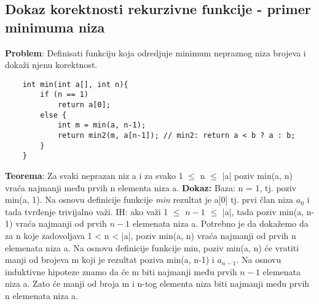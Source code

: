 \documentclass{article}
\begin{document}
\subsection{Dokaz korektnosti rekurzivne funkcije - primer minimuma niza}
\textbf{Problem}: Definisati funkciju koja odredjuje minimum nepraznog niza brojeva i dokaži njenu korektnost.
\begin{lstlisting}
    int min(int a[], int n){
        if (n == 1)
  	        return a[0]; 
        else { 
		    int m = min(a, n-1); 
		    return min2(m, a[n-1]); // min2: return a < b ? a : b;
	    }
    }
\end{lstlisting}
\textbf{Teorema}: Za svaki neprazan niz a i za svako 1 $\leq$ n $\leq$ $|$a$|$ poziv min(a, n) vraća najmanji među prvih n elementa niza a.
\newline \hspace*{0.4cm}\textbf{Dokaz:}
\newline \hspace*{0.8cm}Baza: n = 1, tj. poziv min(a, 1). Na osnovu definicije funkcije \textit{min} \newline \hspace*{0.8cm}rezultat je a[0] tj. prvi član niza $a_{0}$ i tada tvrđenje trivijalno važi.
\newline \hspace*{0.8cm}IH: ako važi 1 $\leq$ $n-1$ $\leq$ |a|, tada poziv min(a, n-1) vraća najmanji od \hspace*{0.8cm}prvih $n-1$ elemenata niza 
	      a. Potrebno je da dokažemo da za n koje \hspace*{0.8cm}zadovoljava 1 < n < |a|, poziv min(a, n) vraća 	  	      najmanji od prvih n \newline \hspace*{0.8cm}elemenata niza a. Na osnovu definicije funkcije min, poziv min(a, 
	      n) će \hspace*{0.8cm}vratiti manji od brojeva m koji je rezultat poziva min(a, n-1) i $a_{n-1}$. Na \hspace*{0.8cm}osnovu 		induktivne hipoteze znamo da će m biti najmanji među prvih $n-1$ \hspace*{0.8cm}elemenata niza a. Zato 	      će manji od broja m i n-tog elementa niza biti \hspace*{0.8cm}najmanji među prvih n elemenata niza a.
\end{document}
